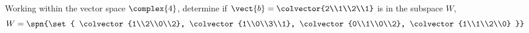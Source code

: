 Working within the vector space $\complex{4}$, determine if 
$\vect{b} = \colvector{2\\1\\2\\1}$ is in the subspace $W$,
\begin{equation*}
W = \spn{\set{
\colvector{1\\2\\0\\2}, 
\colvector{1\\0\\3\\1}, 
\colvector{0\\1\\0\\2}, 
\colvector{1\\1\\2\\0}
}}
\end{equation*}